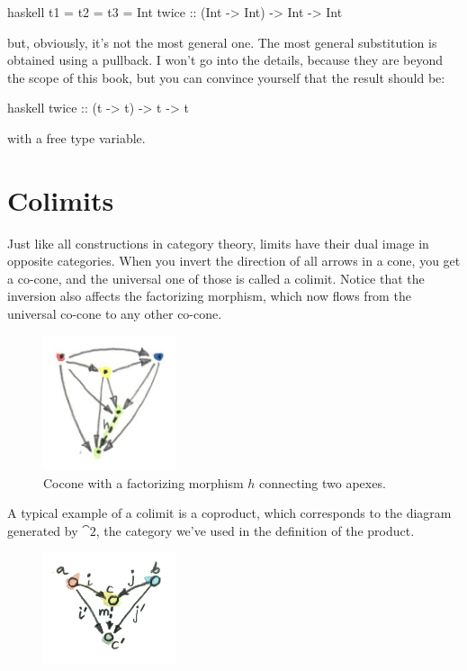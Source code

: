 \begin{snip}{haskell}
t1 = t2 = t3 = Int
twice :: (Int -> Int) -> Int -> Int
\end{snip}
but, obviously, it's not the most general one. The most general
substitution is obtained using a pullback. I won't go into the details,
because they are beyond the scope of this book, but you can convince
yourself that the result should be:

\begin{snip}{haskell}
twice :: (t -> t) -> t -> t
\end{snip}
with  a free type variable.

\section{Colimits}

Just like all constructions in category theory, limits have their dual
image in opposite categories. When you invert the direction of all
arrows in a cone, you get a co-cone, and the universal one of those is
called a colimit. Notice that the inversion also affects the factorizing
morphism, which now flows from the universal co-cone to any other
co-cone.

\begin{figure}[H]
  \centering
  \includegraphics[width=0.35\textwidth]{images/colimit.jpg}
  \caption{Cocone with a factorizing morphism $h$ connecting two apexes.}
\end{figure}

\noindent
A typical example of a colimit is a coproduct, which corresponds to the
diagram generated by $\cat{2}$, the category we've used in the
definition of the product.

\begin{figure}[H]
  \centering
  \includegraphics[width=0.35\textwidth]{images/coproductranking.jpg}
\end{figure}

